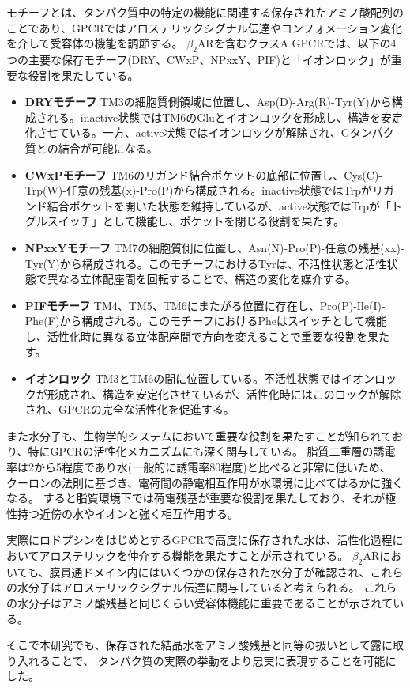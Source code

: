 モチーフとは、タンパク質中の特定の機能に関連する保存されたアミノ酸配列のことであり、GPCRではアロステリックシグナル伝達やコンフォメーション変化を介して受容体の機能を調節する。
$\beta_2$ARを含むクラスA GPCRでは、以下の4つの主要な保存モチーフ(DRY、CWxP、NPxxY、PIF)と「イオンロック」が重要な役割を果たしている。

\begin{itemize}
  \item \textbf{DRYモチーフ}  
  TM3の細胞質側領域に位置し、Asp(D)-Arg(R)-Tyr(Y)から構成される。inactive状態ではTM6のGluとイオンロックを形成し、構造を安定化させている。一方、active状態ではイオンロックが解除され、Gタンパク質との結合が可能になる。

  \item \textbf{CWxPモチーフ}  
  TM6のリガンド結合ポケットの底部に位置し、Cys(C)-Trp(W)-任意の残基(x)-Pro(P)から構成される。inactive状態ではTrpがリガンド結合ポケットを開いた状態を維持しているが、active状態ではTrpが「トグルスイッチ」として機能し、ポケットを閉じる役割を果たす。

  \item \textbf{NPxxYモチーフ}  
  TM7の細胞質側に位置し、Asn(N)-Pro(P)-任意の残基(xx)-Tyr(Y)から構成される。このモチーフにおけるTyrは、不活性状態と活性状態で異なる立体配座間を回転することで、構造の変化を媒介する。

  \item \textbf{PIFモチーフ}  
  TM4、TM5、TM6にまたがる位置に存在し、Pro(P)-Ile(I)-Phe(F)から構成される。このモチーフにおけるPheはスイッチとして機能し、活性化時に異なる立体配座間で方向を変えることで重要な役割を果たす。

  \item \textbf{イオンロック}  
  TM3とTM6の間に位置している。不活性状態ではイオンロックが形成され、構造を安定化させているが、活性化時にはこのロックが解除され、GPCRの完全な活性化を促進する。
\end{itemize}

また水分子も、生物学的システムにおいて重要な役割を果たすことが知られており、特にGPCRの活性化メカニズムにも深く関与している。
脂質二重層の誘電率は2から5程度であり水(一般的に誘電率80程度)と比べると非常に低いため、
クーロンの法則に基づき、電荷間の静電相互作用が水環境に比べてはるかに強くなる。
すると脂質環境下では荷電残基が重要な役割を果たしており、それが極性持つ近傍の水やイオンと強く相互作用する。

実際にロドプシンをはじめとするGPCRで高度に保存された水は、活性化過程においてアロステリックを仲介する機能を果たすことが示されている\cite{angel2009conserved}。
$\beta_2$ARにおいても、膜貫通ドメイン内にはいくつかの保存された水分子が確認され、これらの水分子はアロステリックシグナル伝達に関与していると考えられる。
これらの水分子はアミノ酸残基と同じくらい受容体機能に重要であることが示されている。

そこで本研究でも、保存された結晶水をアミノ酸残基と同等の扱いとして露に取り入れることで、
タンパク質の実際の挙動をより忠実に表現することを可能にした。
